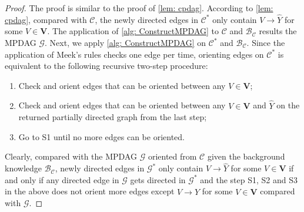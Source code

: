 \documentclass{article} %
\begin{document}
\begin{proof}
    The proof is similar to the proof of \cref{lem: cpdag}. According to \cref{lem: cpdag}, compared with $\mathcal{C}$, the newly directed edges in $\mathcal{C^{*}}$ only contain $V \rightarrow \hat{Y}$ for some $V \in \mathbf{V}$. The application of \cref{alg: ConstructMPDAG} to $\mathcal{C}$ and $\mathcal{B_C}$ results the MPDAG $\mathcal{G}$. Next, we apply \cref{alg: ConstructMPDAG} on $\mathcal{C^{*}}$ and $\mathcal{B_C}$. Since the application of Meek's rules checks one edge per time, orienting edges on $\mathcal{C^{*}}$ is equivalent to the following recursive two-step procedure: 
    \begin{enumerate}%
    \itemsep0em
        \item[S1.] Check and orient edges that can be oriented between any $V \in \mathbf{V}$;
        \item[S2.] Check and orient edges that can be oriented between any $V \in \mathbf{V}$ and $\hat{Y}$ on the returned partially directed graph from the last step;
        \item[S3.] Go to S1 until no more edges can be oriented.
    \end{enumerate}

    Clearly, compared with the MPDAG $\mathcal{G}$ oriented from $\mathcal{C}$ given the background knowledge $\mathcal{B_C}$, newly directed edges in $\mathcal{G^{*}}$ only contain $V \rightarrow \hat{Y}$ for some $V \in \mathbf{V}$ if and only if any directed edge in $\mathcal{G}$ gets directed in $\mathcal{G^{*}}$ and the step S1, S2 and S3 in the above does not orient more edges except $V \rightarrow \hat{Y}$ for some $V \in \mathbf{V}$ compared with $\mathcal{G}$.


\end{proof}
\end{document}
